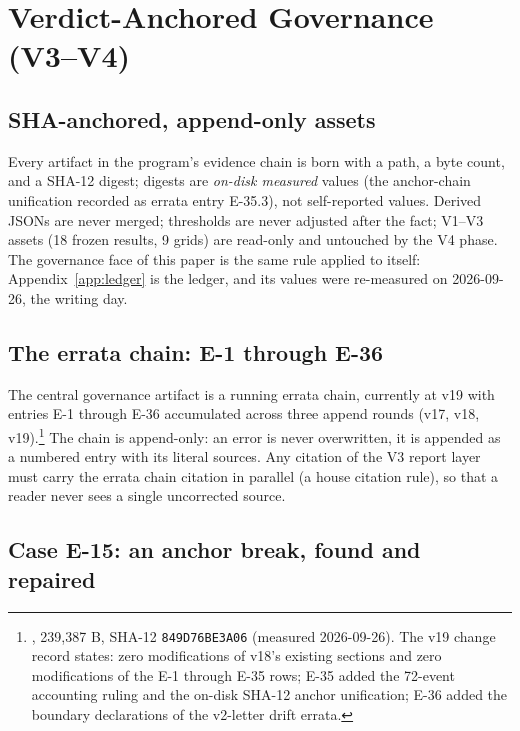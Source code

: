 \documentclass[11pt]{article}
\newcommand{\sha}[1]{\texttt{#1}}
\begin{document}
\section{Verdict-Anchored Governance (V3--V4)}\label{sec:governance}

\subsection{SHA-anchored, append-only assets}

Every artifact in the program's evidence chain is born with a path, a byte count, and a SHA-12 digest; digests are \emph{on-disk measured} values (the anchor-chain unification recorded as errata entry E-35.3), not self-reported values. Derived JSONs are never merged; thresholds are never adjusted after the fact; V1--V3 assets (18 frozen results, 9 grids) are read-only and untouched by the V4 phase. The governance face of this paper is the same rule applied to itself: Appendix~\ref{app:ledger} is the ledger, and its values were re-measured on 2026-09-26, the writing day.

\subsection{The errata chain: E-1 through E-36}

The central governance artifact is a running errata chain, currently at v19 with entries E-1 through E-36 accumulated across three append rounds (v17, v18, v19).\footnote{, 239{,}387 B, SHA-12 \sha{849D76BE3A06} (measured 2026-09-26). The v19 change record states: zero modifications of v18's existing sections and zero modifications of the E-1 through E-35 rows; E-35 added the 72-event accounting ruling and the on-disk SHA-12 anchor unification; E-36 added the boundary declarations of the v2-letter drift errata.} The chain is append-only: an error is never overwritten, it is appended as a numbered entry with its literal sources. Any citation of the V3 report layer must carry the errata chain citation in parallel (a house citation rule), so that a reader never sees a single uncorrected source.

\subsection{Case E-15: an anchor break, found and repaired}
\end{document}
